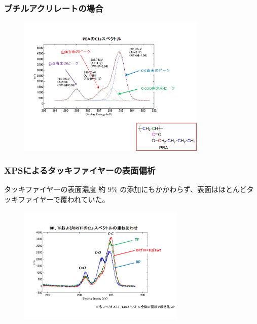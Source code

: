 \documentclass[unicode,12pt]{beamer}%
\begin{document}
\begin{frame}\frametitle{ブチルアクリレートの場合}

\begin{figure}
	\begin{center}
		\includegraphics[width=90mm]{XPS_BA.png}
	\end{center}

\end{figure}

\end{frame}

\begin{frame}\frametitle{XPSによるタッキファイヤーの表面偏析}

\vspace{-0.2\baselineskip}
\begin{alertblock}{タッキファイヤーの表面濃度}
約 $9\%$ の添加にもかかわらず、表面はほとんどタッキファイヤーで覆われていた。
\end{alertblock}

\vspace{-0.4\baselineskip}
\begin{figure}
	\begin{center}
		\includegraphics[width=80mm]{XPS_TF.png}
	\end{center}
\end{figure}
\end{frame}
\end{document}
